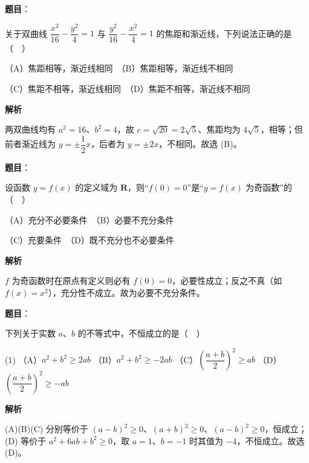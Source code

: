 \begin{answer}

\textbf{题目}：

关于双曲线 \(\dfrac{x^{2}}{16}-\dfrac{y^{2}}{4}=1\) 与 \(\dfrac{y^{2}}{16}-\dfrac{x^{2}}{4}=1\) 的焦距和渐近线，下列说法正确的是（　）

（A）焦距相等，渐近线相同　（B）焦距相等，渐近线不相同

（C）焦距不相等，渐近线相同　（D）焦距不相等，渐近线不相同

\textbf{解析}

两双曲线均有 \(a^{2}=16\)、\(b^{2}=4\)，故 \(c=\sqrt{20}=2\sqrt{5}\)、焦距均为 \(4\sqrt{5}\)，相等；但前者渐近线为 \(y=\pm\dfrac{1}{2}x\)，后者为 \(y=\pm 2x\)，不相同。故选 (B)。


\end{answer}
\begin{answer}

\textbf{题目}：

设函数 \(y=f(x)\) 的定义域为 \(\mathbf{R}\)，则“\(f(0)=0\)”是“\(y=f(x)\) 为奇函数”的（　）

（A）充分不必要条件　（B）必要不充分条件

（C）充要条件　（D）既不充分也不必要条件

\textbf{解析}

\(f\) 为奇函数时在原点有定义则必有 \(f(0)=0\)，必要性成立；反之不真（如 \(f(x)=x^{2}\)），充分性不成立。故为必要不充分条件。


\end{answer}
\begin{answer}

\textbf{题目}：

下列关于实数 \(a\)、\(b\) 的不等式中，不恒成立的是（　）

\begin{gkopts}(1)
\task （A）\(a^{2}+b^{2}\geqslant 2ab\)
\task （B）\(a^{2}+b^{2}\geqslant -2ab\)
\task （C）\(\left(\dfrac{a+b}{2}\right)^{2}\geqslant ab\)
\task （D）\(\left(\dfrac{a+b}{2}\right)^{2}\geqslant -ab\)
\end{gkopts}

\textbf{解析}

(A)(B)(C) 分别等价于 \((a-b)^{2}\geqslant 0\)、\((a+b)^{2}\geqslant 0\)、\((a-b)^{2}\geqslant 0\)，恒成立；(D) 等价于 \(a^{2}+6ab+b^{2}\geqslant 0\)，取 \(a=1\)、\(b=-1\) 时其值为 \(-4\)，不恒成立。故选 (D)。


\end{answer}

